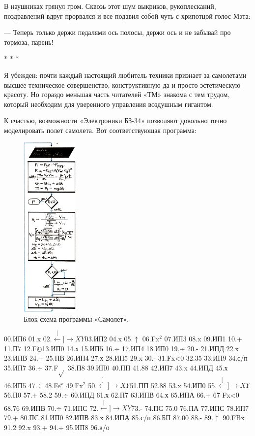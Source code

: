 \documentclass[11pt,a4paper,oneside]{article}
\def\XY{$\stackrel[\leftarrow]{\rightarrow}{XY}$}
\def\FO{F$\circlearrowright$}
\begin{document}
В наушниках грянул гром. Сквозь этот шум выкриков, рукоплесканий, поздравлений вдруг прорвался и все подавил собой чуть с хрипотцой голос Мэта:

— Теперь только держи педалями ось полосы, держи ось и не забывай про тормоза, парень!

* * *

Я убежден: почти каждый настоящий любитель техники признает за самолетами высшее техническое совершенство, конструктивную да и просто эстетическую красоту. Но гораздо меньшая часть читателей «ТМ» знакома с тем трудом, который необходим для уверенного управления воздушным гигантом.

К счастью, возможности «Электроники БЗ-34» позволяют довольно точно моделировать полет самолета. Вот соответствующая программа:

\begin{figure}[H]
\includegraphics[width=0.25\textwidth]{airplane}
\caption{Блок-схема программы «Самолет».}
\end{figure}
00.ИП6 01.x 02.\XY 03.ИП2 04.x 05.$\uparrow$ 06.Fx$^{2}$ 07.ИП3 08.x 09.ИП1 10.+ 11.П7 12.\FO 13.ИП0 14.х 15.ИП5 16.$\div$ 17.ИП4 18.ИП0 19.$\div$ 20.- 21.ИПД 22.x 23.ИПВ 24.+ 25.ПВ 26.ИП4 27.х 28.ИП5 29.x 30.- 31.Fx<0 32.35 33.ИП9 34.с/п 35.ИП7 36.$\div$ 37.F$\sqrt{}$ 38.П8 39.ИП0 40.ПП 41.88 42.ИП7 43.x 44.ИПД 45.х 46.ИП5 47.$\div$ 48.Fe$^{x}$ 49.Fx$^{2}$ 50.\XY 51.ПП 52.88
53.x 54.ИП0 55.\XY 56.П0 57.+ 58.2 59.$\div$
60.ИПД 61.х 62.П7 63.ИПВ 64.х 65.ИПА 66.+ 67 Fx<0 68.76 69.ИПВ 70.$\div$ 71.ИПС 72.\XY 73.- 74.ПС 75.0 76.ПА 77.ИПС 78.ИП7 79.+ 80.ПС 81.ИП0 82.ИПВ 83.x 84.ИПА 85.с/п 86.БП 87.00 88.- 89.$\uparrow$ 90.FBx 91.2 92.x 93.+
94.$\div$ 95.ИП8 96.в/о
\end{document}

